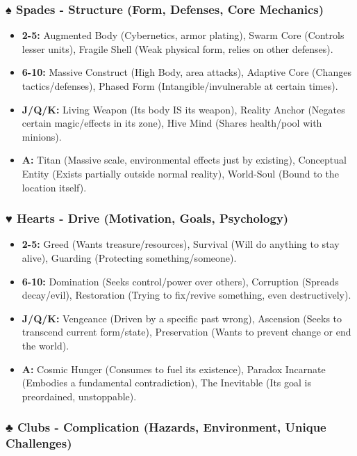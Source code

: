 \subsubsection{♠ Spades - Structure (Form, Defenses, Core Mechanics)}

\begin{itemize}
    \item \textbf{2-5:} Augmented Body (Cybernetics, armor plating), Swarm Core (Controls lesser units), Fragile Shell (Weak physical form, relies on other defenses).
    \item \textbf{6-10:} Massive Construct (High Body, area attacks), Adaptive Core (Changes tactics/defenses), Phased Form (Intangible/invulnerable at certain times).
    \item \textbf{J/Q/K:} Living Weapon (Its body IS its weapon), Reality Anchor (Negates certain magic/effects in its zone), Hive Mind (Shares health/pool with minions).
    \item \textbf{A:} Titan (Massive scale, environmental effects just by existing), Conceptual Entity (Exists partially outside normal reality), World-Soul (Bound to the location itself).
\end{itemize}

\subsubsection{♥ Hearts - Drive (Motivation, Goals, Psychology)}

\begin{itemize}
    \item \textbf{2-5:} Greed (Wants treasure/resources), Survival (Will do anything to stay alive), Guarding (Protecting something/someone).
    \item \textbf{6-10:} Domination (Seeks control/power over others), Corruption (Spreads decay/evil), Restoration (Trying to fix/revive something, even destructively).
    \item \textbf{J/Q/K:} Vengeance (Driven by a specific past wrong), Ascension (Seeks to transcend current form/state), Preservation (Wants to prevent change or end the world).
    \item \textbf{A:} Cosmic Hunger (Consumes to fuel its existence), Paradox Incarnate (Embodies a fundamental contradiction), The Inevitable (Its goal is preordained, unstoppable).
\end{itemize}

\subsubsection{♣ Clubs - Complication (Hazards, Environment, Unique Challenges)}

